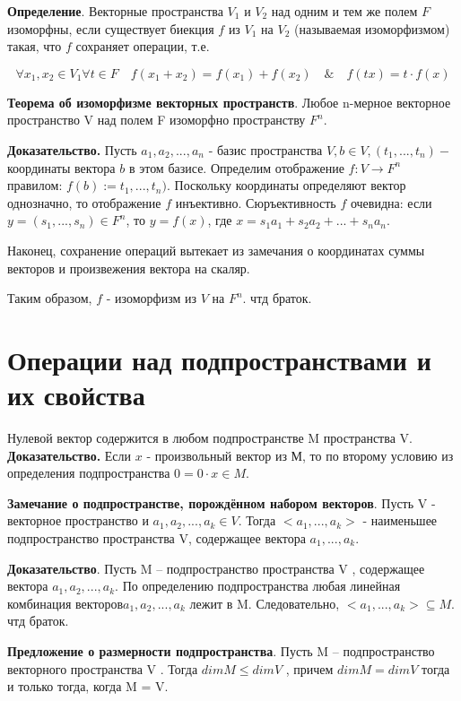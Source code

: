 \documentclass[a4paper]{article}
\begin{document}
{\begin{small}
\textbf{Определение}. Векторные пространства $V_1$ и $V_2$ над одним и тем же полем $F$ изоморфны, если существует биекция $f$ из $V_1$ на $V_2$ (называемая изоморфизмом) такая, что $f$ сохраняет операции, т.е. 

\begin{equation}
\forall x_1, x_2 \in V_1 \forall t \in F \quad f(x_1+x_2) = f(x_1) + f(x_2) \quad \& \quad f(tx) = t \cdot f(x)
\end{equation}

\textbf{Теорема об изоморфизме векторных пространств}. Любое n-мерное векторное пространство V над полем F изоморфно
пространству $F^n$.

\textbf{Доказательство.} Пусть $a_1, a_2, ..., a_n$ - базис пространства $V, b \in V, (t_1, ..., t_n) - $ координаты вектора $b$ в этом базисе. Определим отображение $f: V \rightarrow F^n$ правилом: $f(b) := t_1, ..., t_n)$. Поскольку координаты определяют вектор однозначно, то отображение $f$ инъективно. Сюръективность $f$ очевидна: если $y = (s_1, ..., s_n) \in F^n$, то $y = f(x)$, где $x = s_1a_1 + s_2a_2 + ... + s_na_n$.

Наконец, сохранение операций вытекает из замечания о координатах суммы векторов и произвежения вектора на скаляр. 

Таким образом, $f$ - изоморфизм из $V$ на $F^n$. чтд браток.

\section*{Операции над подпространствами и их свойства}

Нулевой вектор содержится в любом подпространстве M пространства V.
\textbf{Доказательство.} Если $x$ - произвольный вектор из М, то по второму условию из определения подпространства $0 = 0 \cdot x \in M$.

\textbf{Замечание о подпространстве, порождённом набором векторов}. Пусть V - векторное пространство и $a_1, a_2, ..., a_k \in V$. Тогда $<a_1, ..., a_k>$ - наименьшее подпространство пространства V, содержащее вектора $a_1, ..., a_k$.

\textbf{Доказательство}. Пусть M – подпространство пространства V , содержащее
вектора $a_1, a_2, ..., a_k$. По определению подпространства любая линейная
комбинация векторов$a_1, a_2, ..., a_k$ лежит в M. Следовательно,
$<a_1, ..., a_k> \subseteq M$. чтд браток.

\textbf{Предложение о размерности подпространства}. 
Пусть M – подпространство векторного пространства V . Тогда
$dim M \leq dim V$ , причем $dim M = dim V$ тогда и только тогда, когда
M = V.


\end{small}}
\end{document}
